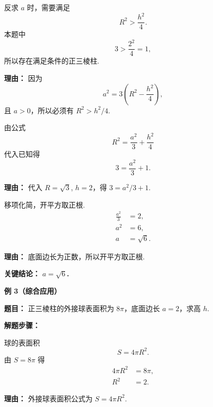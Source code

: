 \begin{examplebox}
\begin{description}[style=nextline, leftmargin=2.8em, labelsep=0.5em, itemsep=0.45em]
		\item[\textbf{第二步（存在性检查）：}] 反求 $a$ 时，需要满足
		      \[
			      R^{2}>\frac{h^{2}}{4}.
		      \]
		      本题中
		      \[
			      3>\frac{2^{2}}{4}=1,
		      \]
		      所以存在满足条件的正三棱柱.
		      \par\textbf{理由：} 因为
		      \[
			      a^{2}=3\left(R^{2}-\frac{h^{2}}{4}\right),
		      \]
		      且 $a>0$，所以必须有 $R^{2}>h^{2}/4$.

		\item[\textbf{第三步（构造方程）：}] 由公式
		      \[
			      R^{2} = \frac{a^{2}}{3} + \frac{h^{2}}{4}
		      \]
		      代入已知得
		      \[
			      3 = \frac{a^{2}}{3} + 1.
		      \]
		      \par\textbf{理由：} 代入 $R=\sqrt{3}$, $h=2$，得 $3 = a^{2}/3 + 1$.

		\item[\textbf{第四步（解方程）：}] 移项化简，开平方取正根.
		      \[
			      \begin{aligned}
				      \frac{a^{2}}{3} & = 2,        \\
				      a^{2}           & = 6,        \\
				      a               & = \sqrt{6}.
			      \end{aligned}
		      \]
		      \par\textbf{理由：} 底面边长为正数，所以开平方取正根.
	\end{description}

	\textbf{\textcolor{CExample}{关键结论：}} \textbf{$a = \sqrt{6}$.}

	\medskip
	\textbf{\textcolor{CExample}{例 3（综合应用）}}

	\textbf{\textcolor{CExample}{题目：}} 正三棱柱的外接球表面积为 $8\pi$，底面边长 $a=2$，求高 $h$.

	\textbf{\textcolor{CExample}{解题步骤：}}
	\begin{description}[style=nextline, leftmargin=2.8em, labelsep=0.5em, itemsep=0.45em]
		\item[\textbf{第一步（由表面积求半径）：}] 球的表面积
		      \[
			      S = 4\pi R^{2}.
		      \]
		      由 $S=8\pi$ 得
		      \[
			      \begin{aligned}
				      4\pi R^{2} & = 8\pi, \\
				      R^{2}      & = 2.
			      \end{aligned}
		      \]
		      \par\textbf{理由：} 外接球表面积公式为 $S=4\pi R^{2}$.


\end{description}
\end{examplebox}

